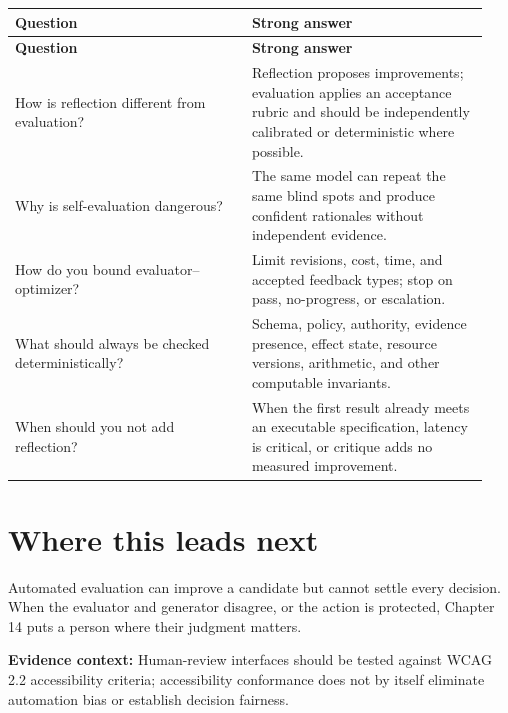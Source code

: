 \BookTableStart
\small
\begin{longtable}{@{}Y{0.4700\linewidth}Y{0.4700\linewidth}@{}}
\color{white}\bfseries \textbf{Question} & \color{white}\bfseries \textbf{Strong answer} \\
\endfirsthead
{}
\color{white}\bfseries \textbf{Question} & \color{white}\bfseries \textbf{Strong answer} \\
\endhead
How is reflection different from evaluation? & Reflection proposes improvements; evaluation applies an acceptance rubric and should be independently calibrated or deterministic where possible. \\
Why is self-evaluation dangerous? & The same model can repeat the same blind spots and produce confident rationales without independent evidence. \\
How do you bound evaluator–optimizer? & Limit revisions, cost, time, and accepted feedback types; stop on pass, no-progress, or escalation. \\
What should always be checked deterministically? & Schema, policy, authority, evidence presence, effect state, resource versions, arithmetic, and other computable invariants. \\
When should you not add reflection? & When the first result already meets an executable specification, latency is critical, or critique adds no measured improvement. \\
\end{longtable}
\BookTableEnd

\section{Where this leads next}

Automated evaluation can improve a candidate but cannot settle every decision. When the evaluator and generator disagree, or the action is protected, Chapter 14 puts a person where their judgment matters.\par



\begin{bookquote}

\textbf{Evidence context:} Human-review interfaces should be tested against WCAG 2.2 accessibility criteria; accessibility conformance does not by itself eliminate automation bias or establish decision fairness. \textbf{}

\end{bookquote}

